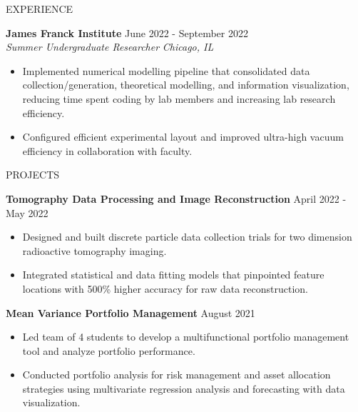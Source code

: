 \documentclass{resume} %
\begin{document}
\begin{rSection}{EXPERIENCE}
\begin{itemize}
\begin{itemize}
\begin{itemize}
      \end{itemize}
   
    
\end{itemize}

 \end{itemize}
 
\textbf{James Franck Institute} \hfill June 2022  - September 2022 \\
\textit{Summer Undergraduate Researcher} \hfill \textit{Chicago, IL}
\vspace{-0.6em}
 \begin{itemize}
   \itemsep -5.8pt {}
   \item Implemented numerical modelling pipeline that consolidated data collection/generation, theoretical modelling, and information visualization, reducing time spent coding by lab members and increasing lab research efficiency.
   \item Configured efficient experimental layout and improved ultra-high vacuum efficiency in collaboration with faculty.
    
 \end{itemize}

\end{rSection} 

\vspace{-0.5em}
\begin{rSection}{PROJECTS}
\vspace{-1.25em}

\item \textbf{Tomography Data Processing and Image Reconstruction} \hfill April 2022 - May 2022
\begin{itemize}
   \vspace{-0.4em}
   \itemsep -5.8pt {}
   \item Designed and built discrete particle data collection trials for two dimension radioactive tomography imaging.
   \item Integrated statistical and data fitting models that pinpointed feature locations with 500\% higher accuracy for raw data reconstruction.
   
\end{itemize}

\item \textbf{Mean Variance Portfolio Management} \hfill August 2021
\begin{itemize}
   \vspace{-0.4em}
   \itemsep -5.8pt {}
   \item Led team of 4 students to develop a multifunctional portfolio management tool and analyze portfolio performance.
   \item Conducted portfolio analysis for risk management and asset allocation strategies using multivariate regression analysis and forecasting with data visualization.
   
\end{itemize}


\end{rSection} 
\end{document}
